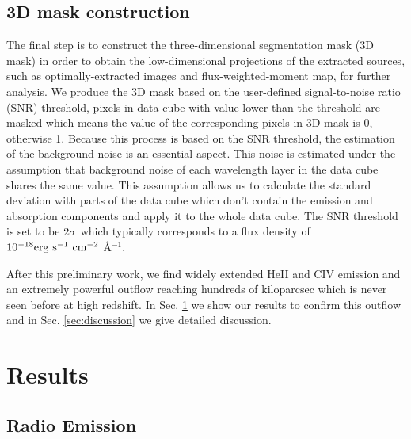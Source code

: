  \subsection{3D mask construction}
 The final step is to construct the three-dimensional segmentation mask (3D mask) in order to obtain the low-dimensional projections of the extracted sources, such as optimally-extracted images and flux-weighted-moment map, for further analysis. We produce the 3D mask based on the user-defined signal-to-noise ratio (SNR) threshold, pixels in data cube with value lower than the threshold are masked which means the value of the corresponding pixels in 3D mask is 0, otherwise 1.  Because this process is based on the SNR threshold, the estimation of the background noise is an essential aspect. This noise is estimated under the assumption that background noise of each wavelength layer in the data cube shares the same value. This assumption allows us to calculate the standard deviation with parts of the data cube which don't contain the emission and absorption components and apply it to the whole data cube. The SNR threshold is set to be $\rm 2\sigma$ which typically corresponds to a flux density of $\rm 10^{-18} erg \ s^{-1} \ cm^{-2}$ \AA$^{-1}$.
 
 After this preliminary work, we find widely extended HeII and CIV emission and an extremely powerful outflow reaching hundreds of kiloparcsec which is never seen before at high redshift. In Sec. \ref{sec:results} we show our results to confirm this outflow and in Sec. \ref{sec:discussion} we give detailed discussion.


\section{Results}
\label{sec:results}
\subsection{Radio Emission}

